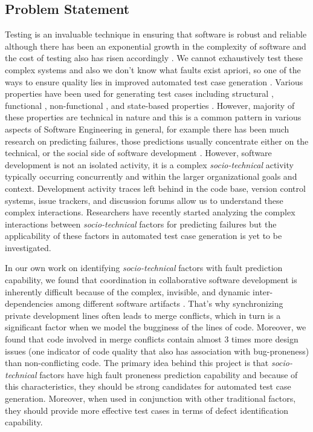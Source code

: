 \documentclass[10pt]{article}
\begin{document}
\subsection{Problem Statement}
Testing is an invaluable technique in ensuring that software is robust and reliable although there has been an exponential growth in the complexity of software and the cost of testing also has risen accordingly \cite{myers2011art}. We cannot exhaustively test these complex systems and also we don't know what faults exist apriori, so one of the ways to ensure quality lies in improved automated test case generation \cite{anand2013orchestrated,harman2012search}. Various properties have been used for generating test cases including
structural \cite{tonella2004evolutionary}, functional \cite{wegener2004evaluation}, non-functional \cite{wegener1998verifying}, and state-based properties \cite{oh2011transition}. However, majority of these properties are technical in nature and this is a common pattern in various aspects of Software Engineering in general, for example there has been much research on predicting failures, those predictions usually concentrate
either on the technical, or the social side of software development \cite{radjenovic2013software}.
However, software development is not an isolated activity, it is a complex \emph{socio-technical} activity typically occurring concurrently and within the larger organizational goals and context. Development activity
traces left behind in the code base, version control systems, issue trackers, and discussion forums allow us to understand these complex interactions. Researchers have recently started analyzing the complex interactions between \emph{socio-technical} factors for predicting failures but the applicability of these factors in automated test case generation is yet to be investigated.

In our own work on identifying \emph{socio-technical} factors with fault prediction capability, we found that coordination in collaborative software development is inherently difficult because of the complex, invisible, and dynamic inter-dependencies among different software artifacts \cite{ahmedempirical}. That’s why synchronizing private development lines often leads to merge conflicts, which in turn is a significant factor when we model the bugginess of the lines of code. Moreover, we found that code involved in merge conflicts contain almost 3 times more design issues (one indicator of code quality that also has association with bug-proneness) than non-conflicting code. The primary idea behind this project is that \emph{socio-technical} factors have high fault proneness prediction capability and because of this characteristics, they should be strong candidates for automated test case generation. Moreover, when used in conjunction with other traditional factors, they should provide more effective test cases in terms of defect identification capability.  
\end{document}
